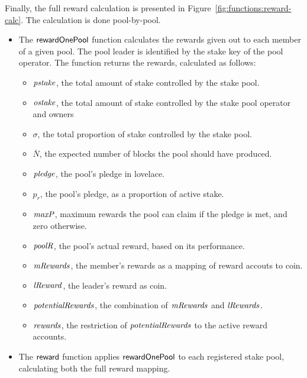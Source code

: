Finally, the full reward calculation is presented in Figure~\ref{fig:functions:reward-calc}.
The calculation is done pool-by-pool.
\begin{itemize}
\item The $\mathsf{rewardOnePool}$ function calculates the rewards given out to
  each member of a given pool. The pool leader is identified by the stake key of
  the pool operator. The function returns the rewards, calculated as follows:
    \begin{itemize}
      \item $\mathit{pstake}$, the total amount of stake controlled by the stake pool.
      \item $\mathit{ostake}$, the total amount of stake controlled by the stake pool operator
        and owners
      \item $\sigma$, the total proportion of stake controlled by the stake pool.
      \item $\overline{N}$, the expected number of blocks the pool should have produced.
      \item $\mathit{pledge}$, the pool's pledge in lovelace.
      \item $p_r$, the pool's pledge, as a proportion of active stake.
      \item $\mathit{maxP}$, maximum rewards the pool can claim if the pledge is met,
        and zero otherwise.
      \item $\mathit{poolR}$, the pool's actual reward, based on its performance.
      \item $\mathit{mRewards}$, the member's rewards as a mapping of reward accouts to coin.
      \item $\mathit{lReward}$, the leader's reward as coin.
      \item $\mathit{potentialRewards}$, the combination of $\mathit{mRewards}$ and $\mathit{lRewards}$.
      \item $\mathit{rewards}$, the restriction of $\mathit{potentialRewards}$ to the active
        reward accounts.
    \end{itemize}
  \item The $\mathsf{reward}$ function applies $\mathsf{rewardOnePool}$ to each registered stake
    pool, calculating both the full reward mapping.
\end{itemize}

